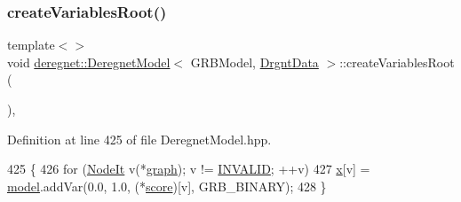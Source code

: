 \mbox{\label{classderegnet_1_1DeregnetModel_aef6cc7f88d0590243d12b9c473ca3ee9}} 
\subsubsection{\texorpdfstring{create\+Variables\+Root()}{createVariablesRoot()}\hspace{0.1cm}{\footnotesize\ttfamily [2/3]}}
{\footnotesize\ttfamily template$<$$>$ \\
void \hyperlink{classderegnet_1_1DeregnetModel}{deregnet\+::\+Deregnet\+Model}$<$ G\+R\+B\+Model, \hyperlink{classderegnet_1_1DrgntData}{Drgnt\+Data} $>$\+::create\+Variables\+Root (\begin{DoxyParamCaption}{ }\end{DoxyParamCaption})\hspace{0.3cm}{\ttfamily [inline]}, {\ttfamily [private]}}



Definition at line 425 of file Deregnet\+Model.\+hpp.


\begin{DoxyCode}
425                                                              \{
426     \textcolor{keywordflow}{for} (\hyperlink{namespacederegnet_ac34314e1b5f456fc6d1bb9d96316de4a}{NodeIt} v(*\hyperlink{classderegnet_1_1DeregnetModel_a3cd2f54b8e061ef5bed32708d9bc1ef1}{graph}); v != \hyperlink{usinglemon_8hpp_adf770fe2eec438e3758ffe905dbae208}{INVALID}; ++v)
427         \hyperlink{classderegnet_1_1DeregnetModel_a360c980f3fec4dfbab50e9bb06a933a8}{x}[v] = \hyperlink{classderegnet_1_1DeregnetModel_a30d525de2086e342b33fe3e45ede4947}{model}.addVar(0.0, 1.0, (*\hyperlink{classderegnet_1_1DeregnetModel_a46224b0bda5bab796d3b7cb41c184a4d}{score})[v], GRB\_BINARY);
428 \}
\end{DoxyCode}
\mbox{\label{classderegnet_1_1DeregnetModel_a338d7fe9e37a2dc4e4341b10bdce991f}} 
